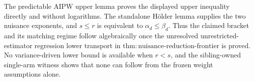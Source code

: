 The predictable AIPW upper lemma proves the displayed upper inequality directly and without logarithms.  The standalone Hölder lemma supplies the two nuisance exponents, and \(s\leq r\) is equivalent to \(\alpha_d\leq\beta_d\).  Thus the claimed bracket and its matching regime follow algebraically once the unresolved unrestricted-estimator regression lower transport in \(\mathrm{thm{:}nuisance\text{-}reduction\text{-}frontier}\) is proved.  No variance-driven lower bound is available when \(r<s\), and the sibling-owned single-arm witness shows that none can follow from the frozen weight assumptions alone.